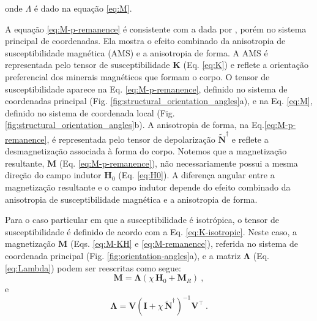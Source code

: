 onde ${\Lambda}$ é dado na equação \ref{eq:M}.

A equação \ref{eq:M-p-remanence} é consistente com a dada por \citet[Eq. ~38]{clark1986}, porém no sistema principal de coordenadas. Ela mostra o efeito combinado da anisotropia de susceptibilidade magnética (AMS) e a anisotropia de forma. A AMS é representada pelo tensor de susceptibilidade $\mathbf{K}$ (Eq. \ref{eq:K}) e reflete a orientação preferencial dos minerais magnéticos que formam o corpo. O tensor de susceptibilidade aparece na Eq. \ref{eq:M-p-remanence}, definido no sistema de coordenadas principal (Fig. \ref{fig:structural_orientation_angles}a), e na Eq. \ref{eq:M}, definido no sistema de coordenada local
(Fig. \ref{fig:structural_orientation_angles}b). A anisotropia de forma, na Eq.\ref{eq:M-p-remanence}, é representada pelo tensor de depolarização $\tilde{\mathbf{N}}^{\dagger}$ e reflete a desmagnetização associada à forma do corpo. Notemos que a magnetização resultante, $\mathbf{M}$ (Eq. \ref{eq:M-p-remanence}), não necessariamente possui a mesma direção do campo indutor $\mathbf{H}_{0}$
(Eq. \ref{eq:H0}). A diferença angular entre a magnetização resultante e o campo indutor depende do efeito combinado da anisotropia de susceptibilidade magnética e a anisotropia de forma.

Para o caso particular em que a susceptibilidade é isotrópica,
o tensor de susceptibilidade é definido de acordo com a Eq. \ref{eq:K-isotropic}.
Neste caso, a magnetização $\mathbf{M}$ (Eqs. \ref{eq:M-KH} e \ref{eq:M-remanence}),
referida no sistema de coordenada principal (Fig. \ref{fig:orientation-angles}a),
e a matriz $\mathbf{\Lambda}$ (Eq. \ref{eq:Lambda})
podem ser reescritas como segue:
\begin{equation}
\mathbf{M} = \mathbf{\Lambda} \left( \chi \, \mathbf{H}_{0} +
\mathbf{M}_{R} \right) \: ,
\label{eq:M-K-isotropic}
\end{equation}
e
\begin{equation}
\mathbf{\Lambda} = \mathbf{V}
\left( \mathbf{I} + \chi \, \tilde{\mathbf{N}}^{\dagger} \right)^{-1}
\mathbf{V}^{\top} \: .
\label{eq:Lambda-K-isotropic}
\end{equation}

